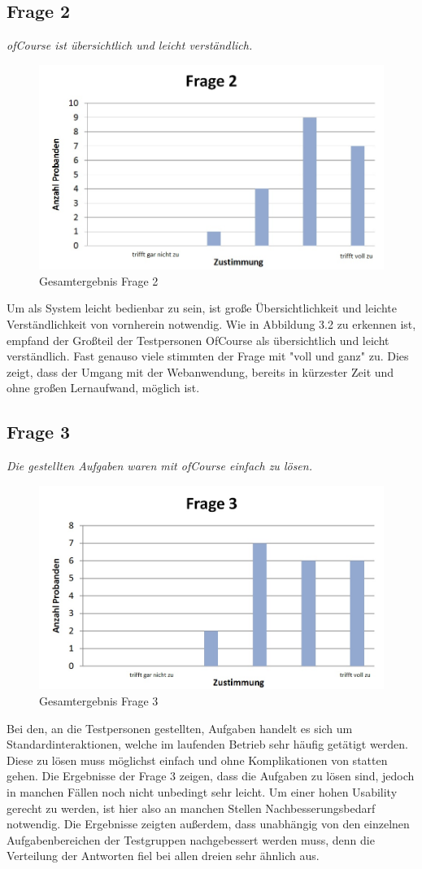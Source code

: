 \subsection{Frage 2}
\begin{center}
	{\it ofCourse ist übersichtlich und leicht verständlich.}
\end{center}
\begin{figure}[h]
\centering
\includegraphics[width=0.7\linewidth]{img/Frage2}
\caption{Gesamtergebnis Frage 2}
\label{fig:Frage2}
\end{figure}
Um als System leicht bedienbar zu sein, ist große Übersichtlichkeit und leichte Verständlichkeit von vornherein notwendig. Wie in Abbildung 3.2 zu erkennen ist, empfand der Großteil der Testpersonen OfCourse als übersichtlich und leicht verständlich. Fast genauso viele stimmten der Frage mit "voll und ganz" zu. Dies zeigt, dass der Umgang mit der Webanwendung, bereits in kürzester Zeit und ohne großen Lernaufwand, möglich ist.
\newpage
\subsection{Frage 3}
\begin{center}
	{\it Die gestellten Aufgaben waren mit ofCourse einfach zu lösen.}
\end{center}
\begin{figure}[h]
\centering
\includegraphics[width=0.7\linewidth]{img/Frage3}
\caption{Gesamtergebnis Frage 3}
\label{fig:Frage3}
\end{figure}
Bei den, an die Testpersonen gestellten, Aufgaben handelt es sich um Standardinteraktionen, welche im laufenden Betrieb sehr häufig getätigt werden. Diese zu lösen muss möglichst einfach und ohne Komplikationen von statten gehen. Die Ergebnisse der Frage 3 zeigen, dass die Aufgaben zu lösen sind, jedoch in manchen Fällen noch nicht unbedingt sehr leicht. Um einer hohen Usability gerecht zu werden, ist hier also an manchen Stellen Nachbesserungsbedarf notwendig. Die Ergebnisse zeigten außerdem, dass unabhängig von den einzelnen Aufgabenbereichen der Testgruppen nachgebessert werden muss, denn die Verteilung der Antworten fiel bei allen dreien sehr ähnlich aus.
\newpage
